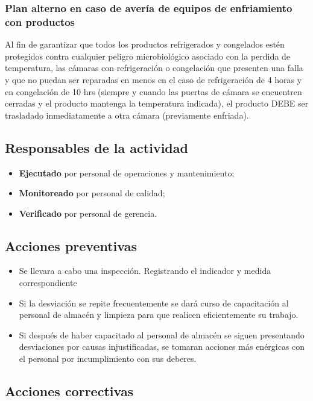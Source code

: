\subsubsection{Plan alterno en caso de avería de equipos de enfriamiento con productos}

Al fin de garantizar que todos los productos refrigerados y congelados estén protegidos contra cualquier peligro microbiológico asociado con la perdida de temperatura, las cámaras con refrigeración o congelación que presenten una falla y que no puedan ser reparadas en menos en el caso de refrigeración de 4 horas y en congelación de 10 hrs (siempre y cuando las puertas de cámara se encuentren cerradas y el producto mantenga la temperatura indicada), el producto DEBE ser trasladado inmediatamente a otra cámara (previamente enfriada).

\subsection{Responsables de la actividad}

\begin{itemize}
	\item \textbf{Ejecutado} por personal de operaciones y mantenimiento;
	\item \textbf{Monitoreado} por personal de calidad;
	\item \textbf{Verificado} por personal de gerencia.
\end{itemize}

\subsection{Acciones preventivas}

\begin{itemize}
	\item Se llevara a cabo una inspección. Registrando el indicador y medida correspondiente
	\item Si la desviación se repite frecuentemente se dará curso de capacitación al personal de almacén y limpieza para que realicen eficientemente su trabajo.
	\item Si después de haber capacitado al personal de almacén se siguen presentando desviaciones por causas injustificadas, se tomaran acciones más enérgicas con el personal por incumplimiento con sus deberes.
\end{itemize}

\subsection{Acciones correctivas}

